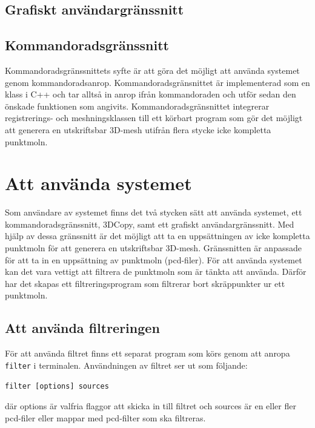 \documentclass[a4paper,titlepage,12pt]{article}
\begin{document}
	\subsection{Grafiskt användargränssnitt}
	
	\subsection{Kommandoradsgränssnitt}
		Kommandoradsgränssnittets syfte är att göra det möjligt att använda systemet genom kommandoradsanrop. Kommandoradsgränsnittet är implementerad som en klass i C++ och tar alltså in anrop ifrån kommandoraden och utför sedan den önskade funktionen som angivits. Kommandoradsgränsnittet integrerar registrerings- och meshningsklassen till ett körbart program som gör det möjligt att generera en utskriftsbar 3D-mesh utifrån flera stycke icke kompletta punktmoln.
	
\newpage

\section{Att använda systemet}
	Som användare av systemet finns det två stycken sätt att använda systemet, ett kommandoradsgränssnitt, 3DCopy, samt ett grafiskt användargränssnitt. Med hjälp av dessa gränssnitt är det möjligt att ta en uppsättningen av icke kompletta punktmoln för att generera en utskriftsbar 3D-mesh. Gränssnitten är anpassade för att ta in en uppsättning av punktmoln (pcd-filer). För att använda systemet kan det vara vettigt att filtrera de punktmoln som är tänkta att använda. Därför har det skapas ett filtreringsprogram som filtrerar bort skräppunkter ur ett punktmoln.
	
	\subsection{Att använda filtreringen}
	För att använda filtret finns ett separat program som körs genom att anropa \texttt{filter} i terminalen. Användningen av filtret ser ut som följande:
	
	\texttt{filter [options] sources}
	
	där options är valfria flaggor att skicka in till filtret och sources är en eller fler pcd-filer eller mappar med pcd-filter som ska filtreras.
	
\end{document}
